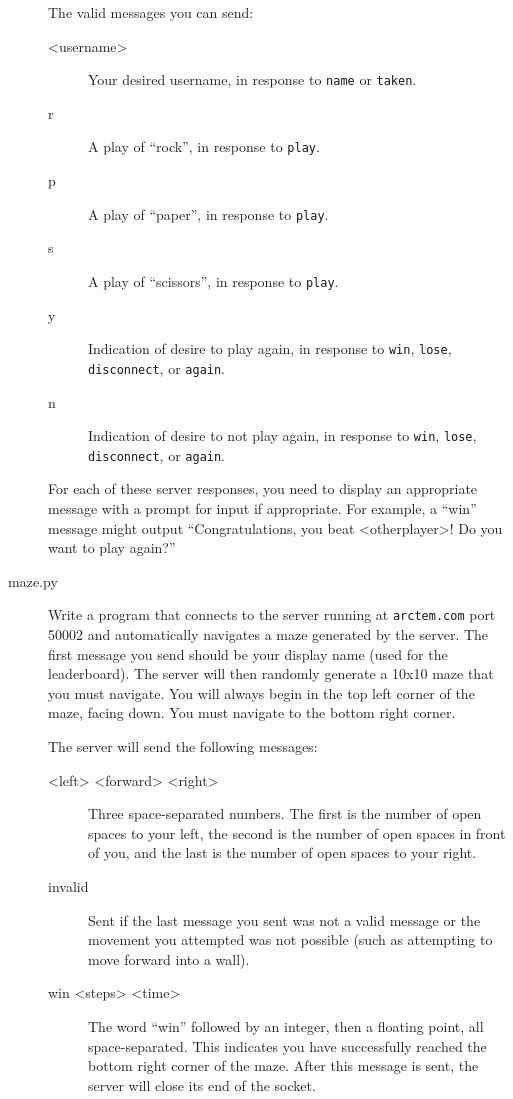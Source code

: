 \documentclass[11pt]{cselabheader}
\begin{document}
\begin{description}
  The valid messages you can send:

  \begin{description}
  \item[<username>] Your desired username, in response to \lstinline{name} or
    \lstinline{taken}.
  \item[r] A play of ``rock'', in response to \lstinline{play}.
  \item[p] A play of ``paper'', in response to \lstinline{play}.
  \item[s] A play of ``scissors'', in response to \lstinline{play}.
  \item[y] Indication of desire to play again, in response to \lstinline{win},
    \lstinline{lose}, \lstinline{disconnect}, or \lstinline{again}.
  \item[n] Indication of desire to not play again, in response to \lstinline{win},
    \lstinline{lose}, \lstinline{disconnect}, or \lstinline{again}.
  \end{description}

  For each of these server responses, you need to display an appropriate message
  with a prompt for input if appropriate. For example, a ``win'' message might
  output ``Congratulations, you beat <otherplayer>! Do you want to play again?''

\item[maze.py] Write a program that connects to the server running at \lstinline{arctem.com} port 50002
  and automatically navigates a maze generated by the server. The first message you send should be
  your display name (used for the leaderboard). The server will then randomly generate a 10x10
  maze that you must navigate. You will always begin in the top left corner of the maze, facing
  down. You must navigate to the bottom right corner.

  The server will send the following messages:

  \begin{description}
  \item[<left> <forward> <right>] Three space-separated numbers. The first is the number of open
    spaces to your left, the second is the number of open spaces in front of you, and the last is
    the number of open spaces to your right.
  \item[invalid] Sent if the last message you sent was not a valid message or the movement you
    attempted was not possible (such as attempting to move forward into a wall).
  \item[win <steps> <time>] The word ``win'' followed by an integer, then a floating point,
    all space-separated. This indicates you have successfully reached the bottom right corner of
    the maze. After this message is sent, the server will close its end of the socket.
  \end{description}


\end{description}
\end{document}
